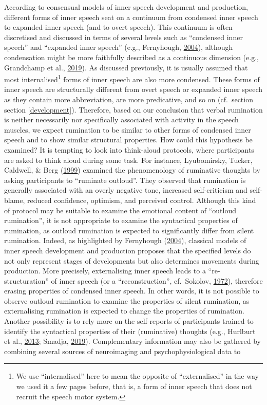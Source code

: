 \documentclass[a4paper,12pt,twoside,openright,oldfontcommands,final]{memoir}
\let\rmarkdownfootnote\footnote%
\def\footnote{\protect\rmarkdownfootnote}
\begin{document}
According to consensual models of inner speech development and production, different forms of inner speech seat on a continuum from condensed inner speech to expanded inner speech (and to overt speech). This continuum is often discretised and discussed in terms of several levels such as \enquote{condensed inner speech} and \enquote{expanded inner speech} (e.g., Fernyhough, \protect\hyperlink{ref-fernyhough_alien_2004}{2004}), although condensation might be more faithfully described as a continuous dimension (e.g., Grandchamp et al., \protect\hyperlink{ref-grandchamp_neurocognitive_2019}{2019}). As discussed previously, it is usually assumed that most internalised\footnote{We use \enquote{internalised} here to mean the opposite of \enquote{externalised} in the way we used it a few pages before, that is, a form of inner speech that does not recruit the speech motor system.} forms of inner speech are also more condensed. These forms of inner speech are structurally different from overt speech or expanded inner speech as they contain more abbreviation, are more predicative, and so on (cf.~section section \ref{development}). Therefore, based on our conclusion that verbal rumination is neither necessarily nor specifically associated with activity in the speech muscles, we expect rumination to be similar to other forms of condensed inner speech and to show similar structural properties. How could this hypothesis be examined? It is tempting to look into think-aloud protocols, where participants are asked to think aloud during some task. For instance, Lyubomirsky, Tucker, Caldwell, \& Berg (\protect\hyperlink{ref-lyubomirsky_why_1999}{1999}) examined the phenomenology of ruminative thoughts by asking participants to \enquote{ruminate outloud}. They observed that rumination is generally associated with an overly negative tone, increased self-criticism and self-blame, reduced confidence, optimism, and perceived control. Although this kind of protocol may be suitable to examine the emotional content of \enquote{outloud rumination}, it is not appropriate to examine the syntactical properties of rumination, as outloud rumination is expected to significantly differ from silent rumination. Indeed, as highlighted by Fernyhough (\protect\hyperlink{ref-fernyhough_alien_2004}{2004}), classical models of inner speech development and production proposes that the specified levels do not only represent stages of developments but also determines movements during production. More precisely, externalising inner speech leads to a \enquote{re-structuration} of inner speech (or a ``reconstruction'', cf.~Sokolov, \protect\hyperlink{ref-sokolov_inner_1972}{1972}), therefore erasing properties of condensed inner speech. In other words, it is not possible to observe outloud rumination to examine the properties of silent rumination, as externalising rumination is expected to change the properties of rumination. Another possibility is to rely more on the self-reports of participants trained to identify the syntactical properties of their (ruminative) thoughts (e.g., Hurlburt et al., \protect\hyperlink{ref-Hurlburt2013}{2013}; Smadja, \protect\hyperlink{ref-smadja_parole_2019}{2019}). Complementary information may also be gathered by combining several sources of neuroimaging and psychophysiological data to 
\end{document}
